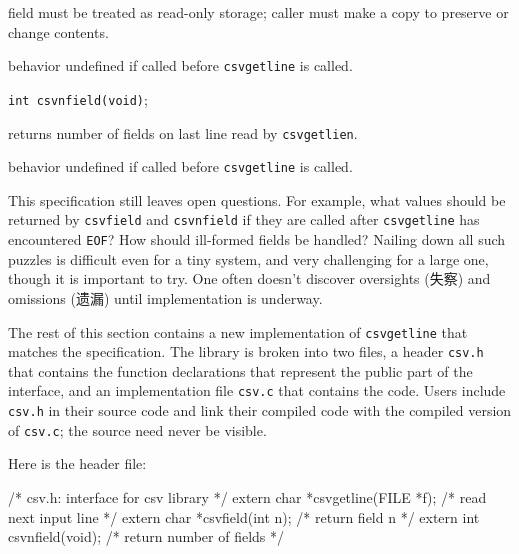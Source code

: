 \begin{myitemize}
\begin{myitemize}
        \item field must be treated as read-only storage; caller must make
            a copy to preserve or change contents.
        \item behavior undefined if called before \verb'csvgetline' is
            called.
\end{myitemize}
\item \verb'int csvnfield(void)';
\begin{myitemize}
        \item returns number of fields on last line read by
        \verb'csvgetlien'.
        \item behavior undefined if called before \verb'csvgetline' is
            called.
\end{myitemize}
\end{myitemize}

This specification still leaves open questions. For example, what values
should be returned by \verb'csvfield' and \verb'csvnfield' if they are
called after \verb'csvgetline' has encountered \verb'EOF'? How should
ill-formed fields be handled? Nailing down all such puzzles is difficult
even for a tiny system, and very challenging for a large one, though it is
important to try. One often doesn't discover oversights (失察) and
omissions (遗漏) until implementation is underway.

The rest of this section contains a new implementation of \verb'csvgetline'
that matches the specification. The library is broken into two files, a
header \verb'csv.h' that contains the function declarations that represent
the public part of the interface, and an implementation file \verb'csv.c'
that contains the code. Users include \verb'csv.h' in their source code and
link their compiled code with the compiled version of \verb'csv.c'; the
source need never be visible.

Here is the header file:
\begin{wellcode}
    /* csv.h: interface for csv library */
    extern char *csvgetline(FILE *f);   /* read next input line */
    extern char *csvfield(int n);       /* return field n */
    extern int  csvnfield(void);        /* return number of fields */
\end{wellcode}

